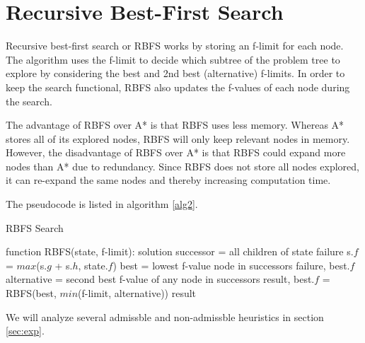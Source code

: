 \section{Recursive Best-First Search}

Recursive best-first search or RBFS works by storing an f-limit for each node. The algorithm uses the f-limit to decide which subtree of the problem tree to explore by considering the best and 2nd best (alternative) f-limits. In order to keep the search functional, RBFS also updates the f-values of each node during the search.

The advantage of RBFS over A* is that RBFS uses less memory. Whereas A* stores all of its explored nodes, RBFS will only keep relevant nodes in memory. However, the disadvantage of RBFS over A* is that RBFS could expand more nodes than A* due to redundancy. Since RBFS does not store all nodes explored, it can re-expand the same nodes and thereby increasing computation time.

The pseudocode is listed in algorithm \ref{alg2}.

\begin{algorithm}
\caption{RBFS Search}
\label{alg2}
\begin{algorithmic}
\STATE function RBFS(state, f-limit):
	\RETURN solution
\ENDIF
\STATE successor = all children of state
	\RETURN failure
\ELSE
		\STATE s.$f$ = $max$(s.$g$ + s.$h$, state.$f$)
	\ENDFOR
	\WHILE{\TRUE}
		\STATE best = lowest f-value node in successors
			\RETURN failure, best.$f$
		\ENDIF
		\STATE alternative = second best f-value of any node in successors
		\STATE result, best.$f$ = RBFS(best, $min$(f-limit, alternative))
			\RETURN result
		\ENDIF
	\ENDWHILE
\ENDIF
\end{algorithmic}
\end{algorithm}

We will analyze several admissble and non-admissble heuristics in section \ref{sec:exp}.

